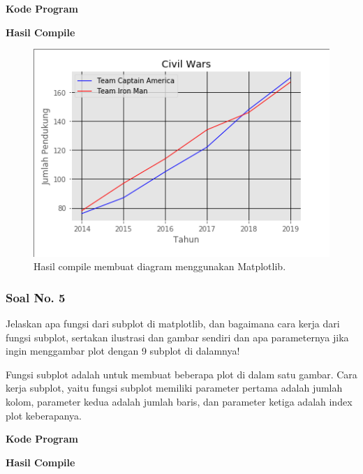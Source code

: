 \hfill \break
\textbf{Kode Program}



\hfill \break
\textbf{Hasil Compile}

\begin{figure}[H]
	\includegraphics[width=12cm]{figures/6/1174089/Teori/4.png}
	\centering
	\caption{Hasil compile membuat diagram menggunakan Matplotlib.}
\end{figure}

\subsubsection{Soal No. 5}
\hfill \break
Jelaskan apa fungsi dari subplot di matplotlib, dan bagaimana cara kerja dari fungsi subplot, sertakan ilustrasi dan gambar sendiri dan apa parameternya jika ingin menggambar plot dengan 9 subplot di dalamnya!

\hfill \break
Fungsi subplot adalah untuk membuat beberapa plot di dalam satu gambar.
\hfill \break
Cara kerja subplot, yaitu fungsi subplot memiliki parameter pertama adalah jumlah kolom, parameter kedua adalah jumlah baris, dan parameter ketiga adalah index plot keberapanya.

\hfill \break
\textbf{Kode Program}



\hfill \break
\textbf{Hasil Compile}

